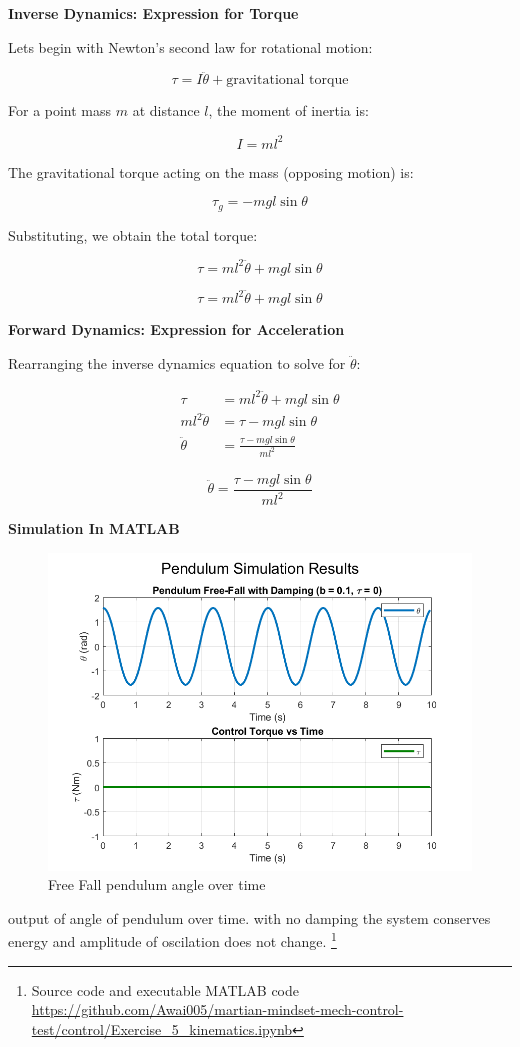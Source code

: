\documentclass[12pt,a4paper]{article}
\begin{document}
\textbf{Inverse Dynamics: Expression for Torque}

Lets begin with Newton’s second law for rotational motion:

\[
\tau = I\ddot{\theta} + \text{gravitational torque}
\]

For a point mass \( m \) at distance \( l \), the moment of inertia is:

\[
I = ml^2
\]

The gravitational torque acting on the mass (opposing motion) is:

\[
\tau_g = -mgl\sin\theta
\]

Substituting, we obtain the total torque:

\[
\tau = ml^2\ddot{\theta} + mgl\sin\theta
\]


\[
\tau = ml^2\ddot{\theta} + mgl\sin\theta
\]

\vspace{1em}

\textbf{Forward Dynamics: Expression for Acceleration}

Rearranging the inverse dynamics equation to solve for \( \ddot{\theta} \):

\begin{align*}
\tau &= ml^2\ddot{\theta} + mgl\sin\theta \\
ml^2\ddot{\theta} &= \tau - mgl\sin\theta \\
\ddot{\theta} &= \frac{\tau - mgl\sin\theta}{ml^2}
\end{align*}


\[
\ddot{\theta} = \frac{\tau - mgl\sin\theta}{ml^2}
\]

\textbf{Simulation In MATLAB}
\begin{figure}[htbp]
  \centering
  \includegraphics[width=0.9\linewidth]{../figs/exercise_7.png}
  \caption{Free Fall pendulum angle over time}
  \label{fig:slider crank}
\end{figure}
output of angle of pendulum over time. with no damping the system conserves energy and amplitude of oscilation does not change.
\footnote{Source code and executable MATLAB code
\url{https://github.com/Awai005/martian-mindset-mech-control-test/control/Exercise_5_kinematics.ipynb}}
\end{document}

